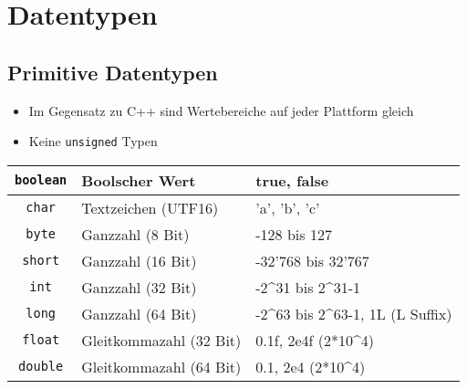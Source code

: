 \section{Datentypen}
\subsection{Primitive Datentypen}
\begin{itemize}
    \item Im Gegensatz zu C++ sind Wertebereiche auf jeder Plattform gleich
    \item Keine \texttt{unsigned} Typen
\end{itemize}
\vspace{-0.8\abovedisplayskip}
\begin{center}
    \begin{tabularx}{0.82\columnwidth}{@{}c l l@{}}
        \lstinline{boolean}    & Boolscher Wert        & true, false\\\hline
        \lstinline{char}       & Textzeichen (UTF16)   & 'a', 'b', 'c'\\\hline
        \lstinline{byte}       & Ganzzahl (8 Bit)             & -128 bis 127\\\hline
        \lstinline{short}      & Ganzzahl (16 Bit)             & -32'768 bis 32'767\\\hline
        \lstinline{int}        & Ganzzahl (32 Bit)             & -2^{31} bis 2^{31}-1\\\hline
        \lstinline{long}       & Ganzzahl (64 Bit)             & -2^{63} bis 2^{63}-1, 1L (L Suffix)\\\hline
        \lstinline{float}      & Gleitkommazahl (32 Bit)       & 0.1f, 2e4f (2*10^4)\\\hline
        \lstinline{double}     & Gleitkommazahl (64 Bit)       & 0.1, 2e4 (2*10^4)\\
    \end{tabularx}
\end{center}
\vspace{-0.8\belowdisplayskip}

